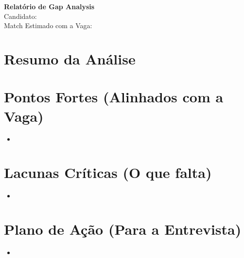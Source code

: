 \documentclass[a4paper,11pt]{article}
\begin{document}
\begin{center}
    {\Huge \textbf{Relatório de Gap Analysis}} \\[0.5cm]
    {\Large Candidato: \textbf{}} \\[0.2cm]
    {\large Match Estimado com a Vaga: \textbf{}}
\end{center}
\vspace{1cm}

\section*{Resumo da Análise}
\vspace{0.5cm}

\section*{Pontos Fortes (Alinhados com a Vaga)}
\begin{itemize}[leftmargin=*]
    \item {}
\end{itemize}
\vspace{0.5cm}

\section*{Lacunas Críticas (O que falta)}
\begin{itemize}[leftmargin=*]
    \item {}
\end{itemize}
\vspace{0.5cm}

\section*{Plano de Ação (Para a Entrevista)}
\begin{itemize}[leftmargin=*]
    \item {}
\end{itemize}
\end{document}
